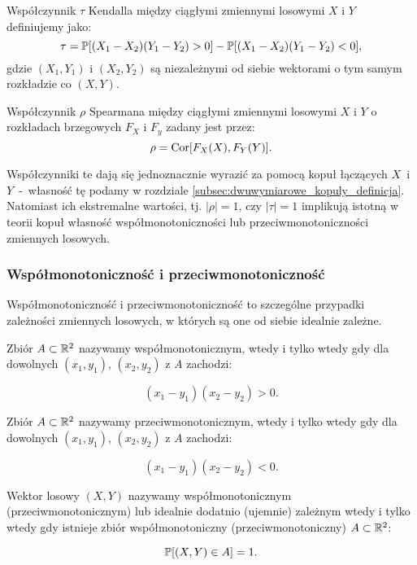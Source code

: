 \begin{df}
	Współczynnik $\tau$ Kendalla między ciągłymi zmiennymi losowymi $X$ i $Y$ definiujemy jako:
	$$ \tau = \mathbb{P}[(X_1-X_2)(Y_1-Y_2)>0] - \mathbb{P}[(X_1-X_2)(Y_1-Y_2) <0], $$
	gdzie $(X_1, Y_1)$ i $(X_2, Y_2)$ są niezależnymi od siebie wektorami o tym samym rozkładzie co $(X, Y)$.
\end{df}

\begin{df}
	Współczynnik $\rho$ Spearmana między ciągłymi zmiennymi losowymi $X$ i $Y$ o rozkładach brzegowych $F_X$ i $F_y$ zadany jest przez:
	$$ \rho = \text{Cor}[F_X(X), F_Y(Y)].$$
\end{df}

Współczynniki te dają się jednoznacznie wyrazić za pomocą kopuł łączących $X$~i~$Y$~-~własność tę podamy w rozdziale \ref{subsec:dwuwymiarowe_kopuly_definicja}. Natomiast ich ekstremalne wartości, tj. $\vert\rho\vert=1$, czy $\vert\tau\vert=1$ implikują istotną w teorii kopuł własność współmonotoniczności lub przeciwmonotoniczności zmiennych losowych.

\subsubsection{Współmonotoniczność i przeciwmonotoniczność}
Współmonotoniczność i przeciwmonotoniczność to szczególne przypadki zależności zmiennych losowych, w których są one od siebie idealnie zależne.

\begin{df}
	Zbiór $A \subset \mathbb{R}^2$ nazywamy współmonotonicznym, wtedy i tylko wtedy gdy dla dowolnych $(x_1, y_1)$, $(x_2, y_2)$ z $A$ zachodzi:
	
	$$ (x_1 - y_1)(x_2 - y_2) >0.$$
\end{df}

\begin{df}
	Zbiór $A \subset \mathbb{R}^2$ nazywamy przeciwmonotonicznym, wtedy i tylko wtedy gdy dla dowolnych $(x_1, y_1)$, $(x_2, y_2)$ z $A$ zachodzi:
	
	$$ (x_1 - y_1)(x_2 - y_2) <0.$$
\end{df}


\begin{df}
	Wektor losowy $(X, Y)$ nazywamy współmonotonicznym (przeciwmonotonicznym) lub idealnie dodatnio (ujemnie) zależnym wtedy i tylko wtedy gdy istnieje zbiór współmonotoniczny (przeciwmonotoniczny) $A\subset\mathbb{R}^2$:
	
	$$ \mathbb{P}[(X,Y)\in A]=1.$$
\end{df}

